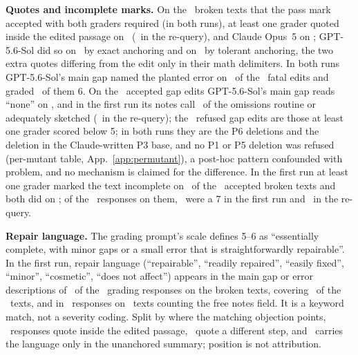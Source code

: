 \textbf{Quotes and incomplete marks.} On the \CRPassBrokenAccP\ broken texts that the pass mark accepted with both graders required (in both runs), at least one grader quoted inside the edited passage on \CRQuoteAnyP\ (\CRQuoteAnyR\ in the re-query), and Claude Opus~5 on \CRQuoteClaudeP; GPT-5.6-Sol did so on \CRQuoteGPTExactP\ by exact anchoring and on \CRQuoteGPTTolP\ by tolerant anchoring, the two extra quotes differing from the edit only in their math delimiters. In both runs GPT-5.6-Sol's main gap named the planted error on \CRGPTFatalNamedP\ of the \CRNPerClass\ fatal edits and graded \CRGPTFatalSixP\ of them 6. On the \CRPassGAccP\ accepted gap edits GPT-5.6-Sol's main gap reads ``none'' on \CRGPTGapMainNoneP, and in the first run its notes call \CRGPTGapRoutineP\ of the omissions routine or adequately sketched (\CRGPTGapRoutineR\ in the re-query); the \CRGapRefusedP\ refused gap edits are those at least one grader scored below 5; in both runs they are the P6 deletions and the deletion in the Claude-written P3 base, and no P1 or P5 deletion was refused (per-mutant table, App.~\ref{app:permutant}), a post-hoc pattern confounded with problem, and no mechanism is claimed for the difference. In the first run at least one grader marked the text incomplete on \CRIncompleteAnyP\ of the \CRPassBrokenAccP\ accepted broken texts and both did on \CRIncompleteBothP; of the \CRNResponsesOnAcc\ responses on them, \CRSevensOnAccP\ were a 7 in the first run and \CRSevensOnAccR\ in the re-query.

\textbf{Repair language.} The grading prompt's scale defines 5--6 as ``essentially complete, with minor gaps or a small error that is straightforwardly repairable''. In the first run, repair language (``repairable'', ``readily repaired'', ``easily fixed'', ``minor'', ``cosmetic'', ``does not affect'') appears in the main gap or error descriptions of \CRRepairResp\ of the \CRNBrokenResponses\ grading responses on the broken texts, covering \CRRepairTexts\ of the \CRNBroken\ texts, and in \CRRepairRespNotes\ responses on \CRRepairTextsNotes\ texts counting the free notes field. It is a keyword match, not a severity coding. Split by where the matching objection points, \PLANTREPAIRON\ responses quote inside the edited passage, \PLANTREPAIROFF\ quote a different step, and \PLANTREPAIRUNANCH\ carries the language only in the unanchored summary; position is not attribution.

